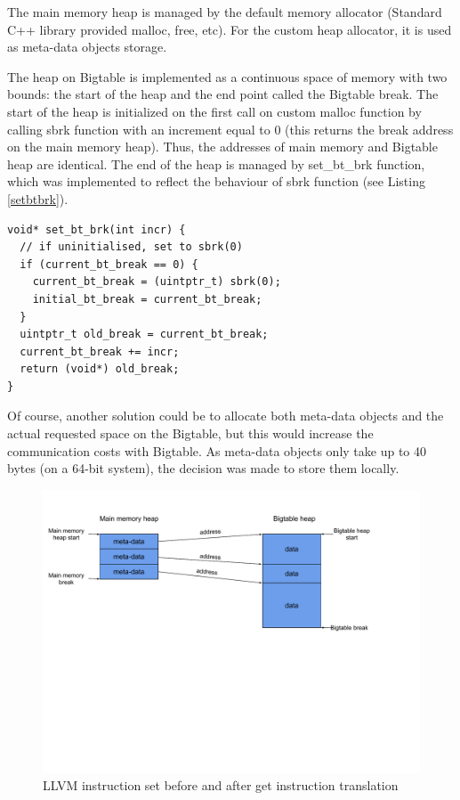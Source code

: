 \documentclass[bsc,frontabs,twoside,singlespacing,parskip,deptreport]{infthesis}     %
\begin{document}
The main memory heap is managed by the default memory allocator (Standard C++ library provided malloc, free, etc). For the custom heap allocator, it is used as meta-data objects storage.

The heap on Bigtable is implemented as a continuous space of memory with two bounds: the start of the heap and the end point  called the Bigtable break. The start of the heap is initialized on the first call on custom malloc function by calling sbrk function with an increment equal to 0 (this returns the break address on the main memory heap). Thus, the addresses of main memory and Bigtable heap are identical. The end of the heap is managed by set\_bt\_brk function, which was implemented to reflect the behaviour of sbrk function (see Listing \ref{setbtbrk}).

\begin{lstlisting}[caption=set\_bt\_brk function implementation, label=setbtbrk, style=block]
void* set_bt_brk(int incr) {
  // if uninitialised, set to sbrk(0)
  if (current_bt_break == 0) {
    current_bt_break = (uintptr_t) sbrk(0);
    initial_bt_break = current_bt_break;
  }
  uintptr_t old_break = current_bt_break;
  current_bt_break += incr;
  return (void*) old_break;
}
\end{lstlisting}

Of course, another solution could be to allocate both meta-data objects and the actual requested space on the Bigtable, but this would increase the communication costs with Bigtable. As meta-data objects only take up to 40 bytes (on a 64-bit system), the decision was made to store them locally.

\begin{figure}[H]
\centering
\includegraphics[width=1\textwidth]{images/heap_organisation}
\caption{LLVM instruction set before and after get instruction translation}
\label{fig:heap_organisation}
\end{figure}
\end{document}
